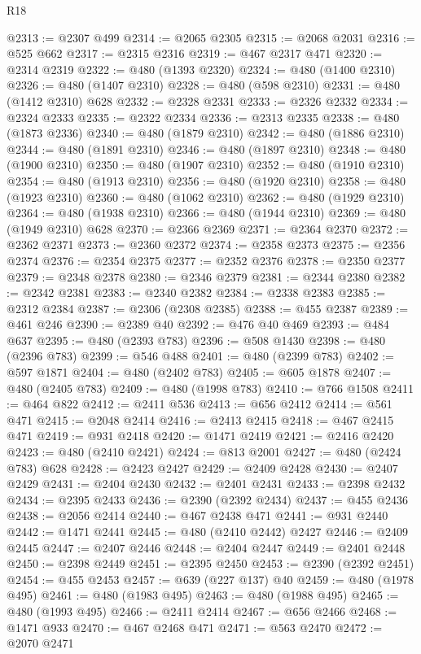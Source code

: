 \begin{lexlean}{R18}
\begin{coremodule}
{{{{{{{{{{{{{{{{{{{{{{{{{{{{{{{{{{{{{{{{{{{{{{{{{{{{{{{{{{{{{{{{{{{{{{{{{{{{{{{{{{{{{{{{{{{{{{{{{{{{{{{{{{{{{@2313 := @2307 @499
@2314 := @2065 @2305
@2315 := @2068 @2031
@2316 := @525 @662
@2317 := @2315 @2316
@2319 := @467 @2317 @471
@2320 := @2314 @2319
@2322 := @480 (@1393 @2320)
@2324 := @480 (@1400 @2310)
@2326 := @480 (@1407 @2310)
@2328 := @480 (@598 @2310)
@2331 := @480 (@1412 @2310) @628
@2332 := @2328 @2331
@2333 := @2326 @2332
@2334 := @2324 @2333
@2335 := @2322 @2334
@2336 := @2313 @2335
@2338 := @480 (@1873 @2336)
@2340 := @480 (@1879 @2310)
@2342 := @480 (@1886 @2310)
@2344 := @480 (@1891 @2310)
@2346 := @480 (@1897 @2310)
@2348 := @480 (@1900 @2310)
@2350 := @480 (@1907 @2310)
@2352 := @480 (@1910 @2310)
@2354 := @480 (@1913 @2310)
@2356 := @480 (@1920 @2310)
@2358 := @480 (@1923 @2310)
@2360 := @480 (@1062 @2310)
@2362 := @480 (@1929 @2310)
@2364 := @480 (@1938 @2310)
@2366 := @480 (@1944 @2310)
@2369 := @480 (@1949 @2310) @628
@2370 := @2366 @2369
@2371 := @2364 @2370
@2372 := @2362 @2371
@2373 := @2360 @2372
@2374 := @2358 @2373
@2375 := @2356 @2374
@2376 := @2354 @2375
@2377 := @2352 @2376
@2378 := @2350 @2377
@2379 := @2348 @2378
@2380 := @2346 @2379
@2381 := @2344 @2380
@2382 := @2342 @2381
@2383 := @2340 @2382
@2384 := @2338 @2383
@2385 := @2312 @2384
@2387 := @2306 (@2308 @2385)
@2388 := @455 @2387
@2389 := @461 @246
@2390 := @2389 @40
@2392 := @476 @40 @469
@2393 := @484 @637
@2395 := @480 (@2393 @783)
@2396 := @508 @1430
@2398 := @480 (@2396 @783)
@2399 := @546 @488
@2401 := @480 (@2399 @783)
@2402 := @597 @1871
@2404 := @480 (@2402 @783)
@2405 := @605 @1878
@2407 := @480 (@2405 @783)
@2409 := @480 (@1998 @783)
@2410 := @766 @1508
@2411 := @464 @822
@2412 := @2411 @536
@2413 := @656 @2412
@2414 := @561 @471
@2415 := @2048 @2414
@2416 := @2413 @2415
@2418 := @467 @2415 @471
@2419 := @931 @2418
@2420 := @1471 @2419
@2421 := @2416 @2420
@2423 := @480 (@2410 @2421)
@2424 := @813 @2001
@2427 := @480 (@2424 @783) @628
@2428 := @2423 @2427
@2429 := @2409 @2428
@2430 := @2407 @2429
@2431 := @2404 @2430
@2432 := @2401 @2431
@2433 := @2398 @2432
@2434 := @2395 @2433
@2436 := @2390 (@2392 @2434)
@2437 := @455 @2436
@2438 := @2056 @2414
@2440 := @467 @2438 @471
@2441 := @931 @2440
@2442 := @1471 @2441
@2445 := @480 (@2410 @2442) @2427
@2446 := @2409 @2445
@2447 := @2407 @2446
@2448 := @2404 @2447
@2449 := @2401 @2448
@2450 := @2398 @2449
@2451 := @2395 @2450
@2453 := @2390 (@2392 @2451)
@2454 := @455 @2453
@2457 := @639 (@227 @137) @40
@2459 := @480 (@1978 @495)
@2461 := @480 (@1983 @495)
@2463 := @480 (@1988 @495)
@2465 := @480 (@1993 @495)
@2466 := @2411 @2414
@2467 := @656 @2466
@2468 := @1471 @933
@2470 := @467 @2468 @471
@2471 := @563 @2470
@2472 := @2070 @2471
}}}}}}}}}}}}}}}}}}}}}}}}}}}}}}}}}}}}}}}}}}}}}}}}}}}}}}}}}}}}}}}}}}}}}}}}}}}}}}}}}}}}}}}}}}}}}}}}}}}}}}}}}}}}}
\end{coremodule}
\end{lexlean}

